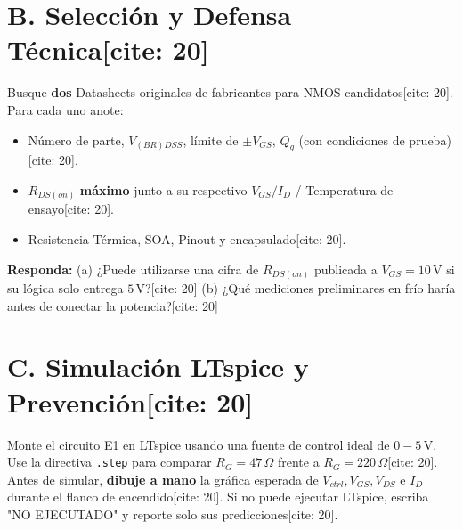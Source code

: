 \documentclass[11pt, a4paper]{article}
\begin{document}
\section*{B. Selección y Defensa Técnica[cite: 20]}
Busque \textbf{dos} Datasheets originales de fabricantes para NMOS candidatos[cite: 20]. Para cada uno anote: 
\begin{itemize}
    \setlength\itemsep{0em}
    \item Número de parte, $V_{(BR)DSS}$, límite de $\pm V_{GS}$, $Q_g$ (con condiciones de prueba)[cite: 20].
    \item $R_{DS(on)}$ \textbf{máximo} junto a su respectivo $V_{GS} / I_D$ / Temperatura de ensayo[cite: 20].
    \item Resistencia Térmica, SOA, Pinout y encapsulado[cite: 20].
\end{itemize}
\textbf{Responda:} (a) ¿Puede utilizarse una cifra de $R_{DS(on)}$ publicada a $V_{GS}=10\,\text{V}$ si su lógica solo entrega $5\,\text{V}$?[cite: 20] (b) ¿Qué mediciones preliminares en frío haría antes de conectar la potencia?[cite: 20]

\section*{C. Simulación LTspice y Prevención[cite: 20]}
Monte el circuito E1 en LTspice usando una fuente de control ideal de $0-5\,\text{V}$. Use la directiva \texttt{.step} para comparar $R_G = 47\,\Omega$ frente a $R_G = 220\,\Omega$[cite: 20]. \\
Antes de simular, \textbf{dibuje a mano} la gráfica esperada de $V_{ctrl}, V_{GS}, V_{DS}$ e $I_D$ durante el flanco de encendido[cite: 20]. Si no puede ejecutar LTspice, escriba "NO EJECUTADO" y reporte solo sus predicciones[cite: 20].
\end{document}
